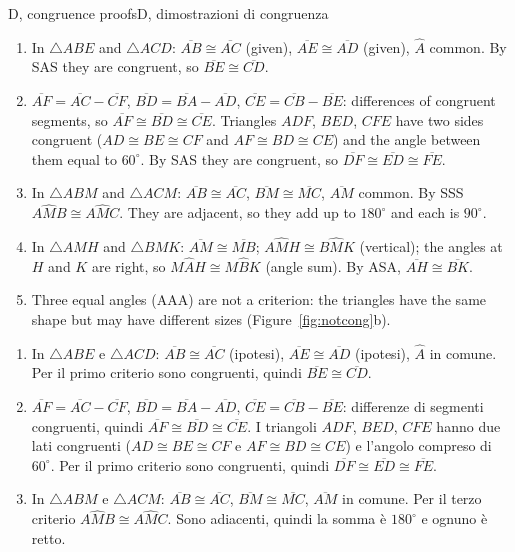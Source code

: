 \documentclass[10pt,a4paper,oneside]{book}
\newcommand{\ang}[3]{#1\widehat{#2}#3}      %
\newcommand{\av}[1]{\widehat{#1}}           %
\newcommand{\seg}[1]{\overline{#1}}         %
\newcommand{\tri}[1]{\triangle #1}          %
\begin{document}
\begin{solution}{D, congruence proofs}{D, dimostrazioni di congruenza}
\begin{enumerate}[label=\textbf{D\arabic*.}, leftmargin=2.2em]
\item In $\tri{ABE}$ and $\tri{ACD}$: $\seg{AB} \cong \seg{AC}$ (given), $\seg{AE} \cong \seg{AD}$ (given), $\av{A}$ common. By SAS they are congruent, so $\seg{BE} \cong \seg{CD}$.
\item $\seg{AF} = \seg{AC} - \seg{CF}$, $\seg{BD} = \seg{BA} - \seg{AD}$, $\seg{CE} = \seg{CB} - \seg{BE}$: differences of congruent segments, so $\seg{AF} \cong \seg{BD} \cong \seg{CE}$. Triangles $ADF$, $BED$, $CFE$ have two sides congruent ($AD \cong BE \cong CF$ and $AF \cong BD \cong CE$) and the angle between them equal to $60^\circ$. By SAS they are congruent, so $\seg{DF} \cong \seg{ED} \cong \seg{FE}$.
\item In $\tri{ABM}$ and $\tri{ACM}$: $\seg{AB} \cong \seg{AC}$, $\seg{BM} \cong \seg{MC}$, $\seg{AM}$ common. By SSS $\ang{A}{M}{B} \cong \ang{A}{M}{C}$. They are adjacent, so they add up to $180^\circ$ and each is $90^\circ$.
\item In $\tri{AMH}$ and $\tri{BMK}$: $\seg{AM} \cong \seg{MB}$; $\ang{A}{M}{H} \cong \ang{B}{M}{K}$ (vertical); the angles at $H$ and $K$ are right, so $\ang{M}{A}{H} \cong \ang{M}{B}{K}$ (angle sum). By ASA, $\seg{AH} \cong \seg{BK}$.
\item Three equal angles (AAA) are not a criterion: the triangles have the same shape but may have different sizes (Figure~\ref{fig:notcong}b).
\end{enumerate}
\tcblower
\begin{enumerate}[label=\textbf{D\arabic*.}, leftmargin=2.2em]
\item In $\tri{ABE}$ e $\tri{ACD}$: $\seg{AB} \cong \seg{AC}$ (ipotesi), $\seg{AE} \cong \seg{AD}$ (ipotesi), $\av{A}$ in comune. Per il primo criterio sono congruenti, quindi $\seg{BE} \cong \seg{CD}$.
\item $\seg{AF} = \seg{AC} - \seg{CF}$, $\seg{BD} = \seg{BA} - \seg{AD}$, $\seg{CE} = \seg{CB} - \seg{BE}$: differenze di segmenti congruenti, quindi $\seg{AF} \cong \seg{BD} \cong \seg{CE}$. I triangoli $ADF$, $BED$, $CFE$ hanno due lati congruenti ($AD \cong BE \cong CF$ e $AF \cong BD \cong CE$) e l'angolo compreso di $60^\circ$. Per il primo criterio sono congruenti, quindi $\seg{DF} \cong \seg{ED} \cong \seg{FE}$.
\item In $\tri{ABM}$ e $\tri{ACM}$: $\seg{AB} \cong \seg{AC}$, $\seg{BM} \cong \seg{MC}$, $\seg{AM}$ in comune. Per il terzo criterio $\ang{A}{M}{B} \cong \ang{A}{M}{C}$. Sono adiacenti, quindi la somma è $180^\circ$ e ognuno è retto.

\end{enumerate}
\end{solution}
\end{document}
